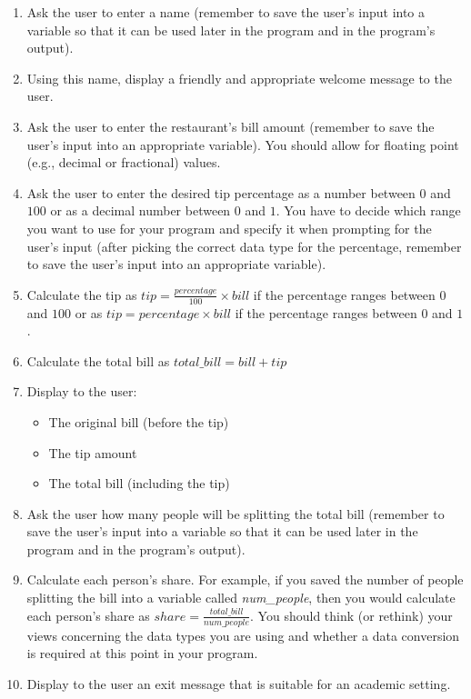 \vspace*{-.1in}
\begin{enumerate}

\item Ask the user to enter a name (remember to save the user's input into a variable so that it can be used later in
  the program and in the program's output).

\item Using this name, display a friendly and appropriate welcome message to the user.

\item Ask the user to enter the restaurant's bill amount (remember to save the user's input into an appropriate
  variable). You should allow for floating point (e.g., decimal or fractional) values.

\item Ask the user to enter the desired tip percentage as a number between $0$ and $100$ or as a decimal number between
  $0$ and $1$. You have to decide which range you want to use for your program and specify it when prompting for the
  user's input (after picking the correct data type for the percentage, remember to save the user's input into an
  appropriate variable).

\item Calculate the tip as $tip = \frac{percentage}{100} \times bill$ if the percentage ranges between $0$ and $100$ or
  as $tip = percentage \times bill$ if the percentage ranges between $0$ and $1$.

\item Calculate the total bill as $total\_bill = bill+tip$

\item Display to the user:
    \begin{itemize}
        \item The original bill (before the tip)
        \item The tip amount
        \item The total bill (including the tip)
    \end{itemize}

\item Ask the user how many people will be splitting the total bill (remember to save the user's input into a variable
  so that it can be used later in the program and in the program's output).

\item Calculate each person's share. For example, if you saved the number of people splitting the bill into a variable
  called {\em num\_people}, then you would calculate each person's share as $share = \frac{total\_bill}{num\_people}$. You should think (or rethink) your views concerning the data types you are using and whether a data
    conversion is required at this point in your program.

\item Display to the user an exit message that is suitable for an academic setting.

\end{enumerate}

